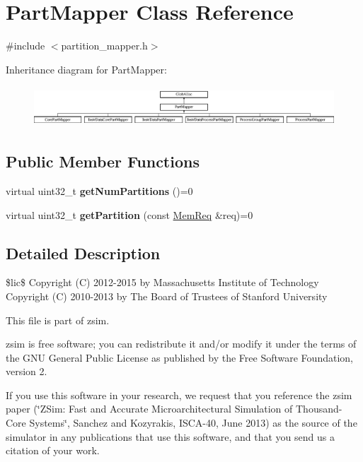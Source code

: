 \hypertarget{classPartMapper}{\section{Part\-Mapper Class Reference}
\label{classPartMapper}
}


{\ttfamily \#include $<$partition\-\_\-mapper.\-h$>$}

Inheritance diagram for Part\-Mapper\-:\begin{figure}[H]
\begin{center}
\leavevmode
\includegraphics[height=1.530055cm]{classPartMapper}
\end{center}
\end{figure}
\subsection*{Public Member Functions}
\begin{DoxyCompactItemize}
\item 
\hypertarget{classPartMapper_af88ebbd6d9dfc527c27a5606039adf1d}{virtual uint32\-\_\-t {\bfseries get\-Num\-Partitions} ()=0}\label{classPartMapper_af88ebbd6d9dfc527c27a5606039adf1d}

\item 
\hypertarget{classPartMapper_a2b0db9f090b4bf8184c32f8782d1af73}{virtual uint32\-\_\-t {\bfseries get\-Partition} (const \hyperlink{structMemReq}{Mem\-Req} \&req)=0}\label{classPartMapper_a2b0db9f090b4bf8184c32f8782d1af73}

\end{DoxyCompactItemize}


\subsection{Detailed Description}
\$lic\$ Copyright (C) 2012-\/2015 by Massachusetts Institute of Technology Copyright (C) 2010-\/2013 by The Board of Trustees of Stanford University

This file is part of zsim.

zsim is free software; you can redistribute it and/or modify it under the terms of the G\-N\-U General Public License as published by the Free Software Foundation, version 2.

If you use this software in your research, we request that you reference the zsim paper (\char`\"{}\-Z\-Sim\-: Fast and Accurate Microarchitectural Simulation of
\-Thousand-\/\-Core Systems\char`\"{}, Sanchez and Kozyrakis, I\-S\-C\-A-\/40, June 2013) as the source of the simulator in any publications that use this software, and that you send us a citation of your work.

